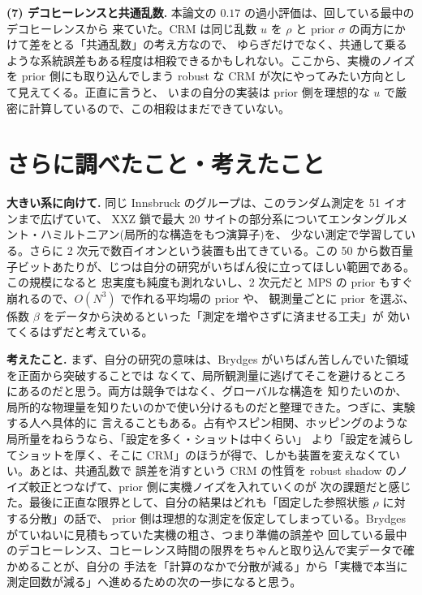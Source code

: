 \documentclass[10pt,a4paper,twocolumn]{ltjsarticle}
\begin{document}
\textbf{(7) デコヒーレンスと共通乱数.} 本論文の $0.17$ の過小評価は、回している最中のデコヒーレンスから
来ていた。CRM は同じ乱数 $u$ を $\rho$ と prior $\sigma$ の両方にかけて差をとる「共通乱数」の考え方なので、
ゆらぎだけでなく、共通して乗るような系統誤差もある程度は相殺できるかもしれない。ここから、実機のノイズを
prior 側にも取り込んでしまう robust な CRM\cite{robust} が次にやってみたい方向として見えてくる。正直に言うと、
いまの自分の実装は prior 側を理想的な $u$ で厳密に計算しているので、この相殺はまだできていない。

\section{さらに調べたこと・考えたこと}
\textbf{大きい系に向けて.} 同じ Innsbruck のグループは、このランダム測定を 51 イオンまで広げていて、
XXZ 鎖で最大 20 サイトの部分系についてエンタングルメント・ハミルトニアン(局所的な構造をもつ演算子)を、
少ない測定で学習している\cite{joshi}。さらに 2 次元で数百イオンという装置も出てきている\cite{2dions}。この
50 から数百量子ビットあたりが、じつは自分の研究がいちばん役に立ってほしい範囲である。この規模になると
忠実度も純度も測れないし、2 次元だと MPS の prior もすぐ崩れるので、$O(N^3)$ で作れる平均場の prior や、
観測量ごとに prior を選ぶ、係数 $\beta$ をデータから決めるといった「測定を増やさずに済ませる工夫」が
効いてくるはずだと考えている。

\textbf{考えたこと.} まず、自分の研究の意味は、Brydges がいちばん苦しんでいた領域を正面から突破することでは
なくて、局所観測量に逃げてそこを避けるところにあるのだと思う。両方は競争ではなく、グローバルな構造を
知りたいのか、局所的な物理量を知りたいのかで使い分けるものだと整理できた。つぎに、実験する人へ具体的に
言えることもある。占有やスピン相関、ホッピングのような局所量をねらうなら、「設定を多く・ショットは中くらい」
より「設定を減らしてショットを厚く、そこに CRM」のほうが得で、しかも装置を変えなくていい。あとは、共通乱数で
誤差を消すという CRM の性質を robust shadow のノイズ較正とつなげて、prior 側に実機ノイズを入れていくのが
次の課題だと感じた。最後に正直な限界として、自分の結果はどれも「固定した参照状態 $\rho$ に対する分散」の話で、
prior 側は理想的な測定を仮定してしまっている。Brydges がていねいに見積もっていた実機の粗さ、つまり準備の誤差や
回している最中のデコヒーレンス、コヒーレンス時間の限界をちゃんと取り込んで実データで確かめることが、自分の
手法を「計算のなかで分散が減る」から「実機で本当に測定回数が減る」へ進めるための次の一歩になると思う。
\end{document}
